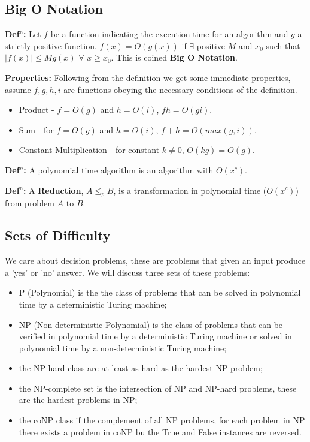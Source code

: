 \documentclass[a4paper,11pt]{report}
\begin{document}
\subsection{Big O Notation}

\textbf{Def$^\text{n}$:} Let $f$ be a function indicating the execution time for an algorithm and $g$ a strictly positive function. $f(x)=O (g(x))$ if $\exists$ positive $ M$ and $x_0$ such that $|f(x)|\leq Mg(x)$ $\forall$ $x\geq x_0$. This is coined \textbf{Big O Notation}.

\textbf{Properties:} Following from the definition we get some immediate properties, assume $f,g,h,i$ are functions obeying the necessary conditions of the definition.
\begin{itemize}
\item Product - $f=O(g)$ and $h=O(i)$, $fh=O(gi)$.
\item Sum - for $f=O(g)$ and $h=O(i)$, $f+h = O(max(g,i))$.
\item Constant Multiplication - for constant $k\neq0$, $O(kg)=O(g)$.
\end{itemize}

\textbf{Def$^n$:} A polynomial time algorithm is an algorithm with $O(x^c)$.

\textbf{Def$^\text{n}$:} A \textbf{Reduction}, $A \leq_p B$, is a transformation in polynomial time ($O(x^c)$) from problem $A$ to $B$.

\subsection{Sets of Difficulty} 

We care about decision problems, these are problems that given an input produce a 'yes' or 'no' answer. We will discuss three sets of these problems:
\begin{itemize}
\item{P (Polynomial) is the the class of problems that can be solved in polynomial time by a deterministic Turing machine;}
\item{NP (Non-deterministic Polynomial) is the class of problems that can be verified in polynomial time by a deterministic Turing machine or solved in polynomial time by a non-deterministic Turing machine;}
\item{the NP-hard class are at least as hard as the hardest NP problem;} 
\item{the NP-complete set is the intersection of NP and NP-hard problems, these are the hardest problems in NP;} 
\item{the coNP class if the complement of all NP problems, for each problem in NP there exists a problem in coNP bu the True and False instances are reversed.}
\end{itemize}
\end{document}
